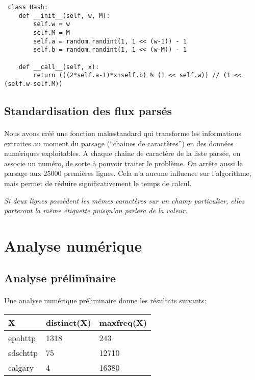 \documentclass[a4paper,11pt]{article}%
\newcommand{\dbend}{{\manual\char127}}
\newenvironment{attention}%
{\description\item[\dbend]\sl}%
{\enddescription}
\begin{document}
\begin{lstlisting}
 class Hash:
    def __init__(self, w, M):
        self.w = w
        self.M = M
        self.a = random.randint(1, 1 << (w-1)) - 1
        self.b = random.randint(1, 1 << (w-M)) - 1
        
    def __call__(self, x):
        return (((2*self.a-1)*x+self.b) % (1 << self.w)) // (1 << (self.w-self.M))
\end{lstlisting}

\subsection{Standardisation des flux parsés}

\paragraph{}Nous avons créé une fonction makestandard qui transforme les informations extraites au moment du parsage (``chaines de caractères'') en des données numériques exploitables.\newline
A chaque chaîne de caractère de la liste parsée, on associe un numéro, de sorte à pouvoir traiter le problème. On arrête aussi le parsage aux 25000 premières lignes. Cela n'a aucune influence sur l'algorithme, mais permet de réduire significativement le temps de calcul.

\begin{attention}
 Si deux lignes possèdent les mêmes caractères sur un champ particulier, elles porteront la même étiquette puisqu'on parlera de la valeur.
\end{attention}

\section{Analyse numérique}

\subsection{Analyse préliminaire}

\paragraph{}Une analyse numérique préliminaire donne les résultats suivants:

\begin{tabularx}{\textwidth}{|l|l|X|}
      \hline X & distinct(X) & maxfreq(X) \\ \hline
      epahttp & 1318 & 243  \\ \hline
      sdschttp & 75 & 12710 \\ \hline
      calgary & 4 & 16380  \\ \hline
\end{tabularx}
\end{document}
